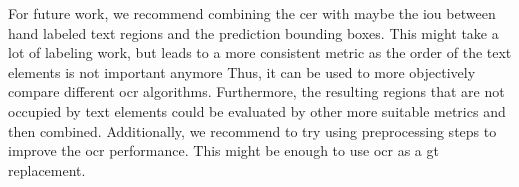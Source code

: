 For future work, we recommend combining the \gls{cer} with maybe the \gls{iou} between hand labeled text regions and the prediction bounding boxes.
This might take a lot of labeling work, but leads to a more consistent metric as the order of the text elements is not important anymore
Thus, it can be used to more objectively compare different \gls{ocr} algorithms.
Furthermore, the resulting regions that are not occupied by text elements could be evaluated by other more suitable metrics and then combined.
Additionally, we recommend to try using preprocessing steps to improve the \gls{ocr} performance.
This might be enough to use \gls{ocr} as a \gls{gt} replacement.
